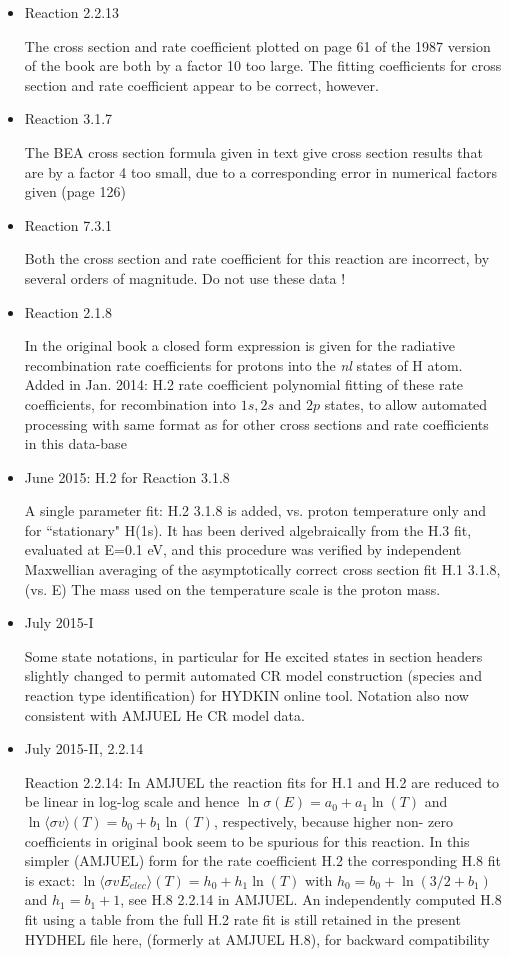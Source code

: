 \documentclass[12pt,dvipdfmx]{article}
\begin{document}
\begin{itemize}
\item{Reaction 2.2.13}

The cross section and rate coefficient plotted on page 61 of the 1987 version of the book are both by
a factor 10 too large.
The fitting coefficients for  cross section and rate coefficient appear to be correct, however.

\item{Reaction 3.1.7}

The BEA cross section formula given in text give cross section results that are by a factor 4 too small,
due to a corresponding error in numerical factors given (page 126)

\item{Reaction 7.3.1}

Both the cross section and rate coefficient for this reaction are incorrect, by several orders of magnitude.
Do not use these data !

\item{Reaction 2.1.8}

In the original book a closed form expression is given for the radiative recombination rate coefficients for protons
into the \emph{nl} states of H atom. Added in Jan. 2014:  H.2 rate coefficient polynomial fitting of these rate coefficients, for recombination into
$1s, 2s$ and $2p$ states, to allow
automated processing with same format as for other cross sections and rate coefficients in this data-base

\item{June 2015: H.2 for Reaction 3.1.8}

A single parameter fit: H.2  3.1.8 is added, vs. proton temperature only and for ``stationary" H(1s). It has been derived
algebraically from the H.3 fit, evaluated at
E=0.1 eV, and this procedure was verified by independent Maxwellian averaging
of the asymptotically correct cross section fit H.1  3.1.8, (vs. E)
The mass used on the temperature scale is the proton mass.

\item{July 2015-I}

Some state notations, in particular for He excited states in section headers slightly changed to permit automated CR
model construction (species and reaction type identification) for HYDKIN online tool. Notation also now consistent with
AMJUEL He CR model data.

\item{July 2015-II,  2.2.14}

Reaction 2.2.14: In AMJUEL the reaction fits for H.1 and H.2 are reduced to be linear in log-log scale and hence $\ln \sigma(E) = a_0 + a_1 \ln(T)$ and $\ln \langle\sigma v\rangle(T) = b_0 + b_1 \ln(T)$, respectively,
because higher non-
zero coefficients in original book \cite{kn:Janev87} seem to be spurious for this reaction. In this simpler (AMJUEL) form for the rate coefficient H.2 the corresponding H.8 fit
is exact: $\ln \langle\sigma v E_{elec}\rangle(T) = h_0 +h_1 \ln(T)$ with $h_0 = b_0+\ln(3/2+b_1)$ and $h_1=b_1+1$, see H.8  2.2.14 in AMJUEL.
An independently computed H.8 fit using a table from the full H.2 rate fit is still retained in the present HYDHEL file here, (formerly at AMJUEL H.8),
for backward compatibility


\end{itemize}
\end{document}
